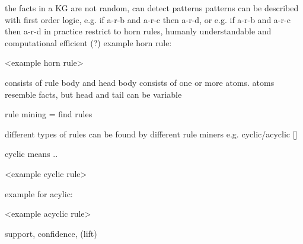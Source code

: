 the facts in a KG are not random, can detect patterns
patterns can be described with first order logic, e.g. if a-r-b and a-r-c then a-r-d, or e.g. if a-r-b and a-r-c then a-r-d
in practice restrict to horn rules, humanly understandable and computational efficient (?)
example horn rule:

<example horn rule>

consists of rule body and head
body consists of one or more atoms.
atoms resemble facts, but head and tail can be variable

rule mining = find rules



different types of rules can be found by different rule miners
e.g. cyclic/acyclic []

cyclic means ..

<example cyclic rule>

example for acylic:

<example acyclic rule>


support, confidence, (lift)



%

%
